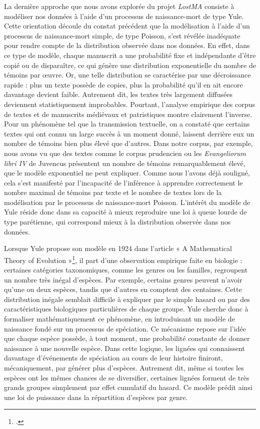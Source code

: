 \documentclass[a4paper,twoside,12pt]{book}
\begin{document}
La dernière approche que nous avons explorée du projet \textit{LostMA} consiste à modéliser nos données à l’aide d’un processus de naissance-mort de type Yule. Cette orientation découle du constat précédent que la modélisation à l’aide d’un processus de naissance-mort simple, de type Poisson, s’est révélée inadéquate pour rendre compte de la distribution observée dans nos données. En effet, dans ce type de modèle, chaque manuscrit a une probabilité fixe et indépendante d’être copié ou de disparaître, ce qui génère une distribution exponentielle du nombre de témoins par œuvre. Or, une telle distribution se caractérise par une décroissance rapide : plus un texte possède de copies, plus la probabilité qu’il en ait encore davantage devient faible. Autrement dit, les textes très largement diffusées deviennent statistiquement improbables. Pourtant, l’analyse empirique des corpus de textes et de manuscrits médiévaux et patristiques montre clairement l’inverse. Pour un phénomène tel que la transmission textuelle, on a constaté que certains textes qui ont connu un large succès à un moment donné, laissent derrière eux un nombre de témoins bien plus élevé que d'autres. Dans notre corpus, par exemple, nous avons vu que des textes comme le corpus prudencien ou les \textit{Evangeliorum libri IV} de Juvencus présentent un nombre de témoins remarquablement élevé, que le modèle exponentiel ne peut expliquer.  Comme nous l'avons déjà souligné, cela s’est manifesté par l’incapacité de l’inférence à apprendre correctement le nombre maximal de témoins par texte et le nombre de textes lors de la modélisation par le processus de naissance-mort Poisson. L’intérêt du modèle de Yule réside donc dans sa capacité à mieux reproduire une loi à queue lourde de type parétienne, qui correspond mieux à la distribution observée dans nos données.

Lorsque Yule propose son modèle en 1924 dans l'article « A Mathematical Theory of Evolution »\footcite{yule1925}, il part d’une observation empirique faite en biologie : certaines catégories taxonomiques, comme les genres ou les familles, regroupent un nombre très inégal d'espèces. Par exemple, certains genres peuvent n’avoir qu’une ou deux espèces, tandis que d'autres en comptent des centaines. Cette distribution inégale semblait difficile à expliquer par le simple hasard ou par des caractéristiques biologiques particulières de chaque groupe. Yule cherche donc à formaliser mathématiquement ce phénomène, en introduisant un modèle de naissance fondé sur un processus de spéciation. Ce mécanisme repose sur l’idée que chaque espèce possède, à tout moment, une probabilité constante de donner naissance à une nouvelle espèce. Dans cette logique, les lignées qui connaissent davantage d’événements de spéciation au cours de leur histoire finiront, mécaniquement, par générer plus d’espèces. Autrement dit, même si toutes les espèces ont les mêmes chances de se diversifier, certaines lignées forment de très grands groupes simplement par effet cumulatif du hasard. Ce modèle prédit ainsi une loi de puissance dans la répartition d'espèces par genre.
\end{document}

